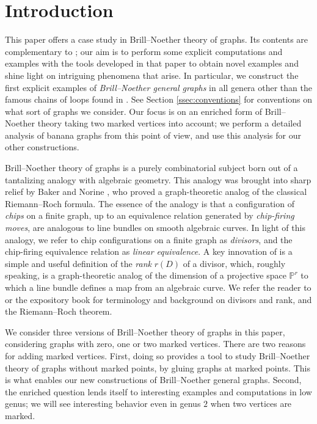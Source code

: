 \documentclass[11pt]{article}
\theoremstyle{definition}
\numberwithin{equation}{section}
\begin{document}
\section{Introduction}
This paper offers a case study in Brill--Noether theory of graphs. Its contents are complementary to \cite{Pfl22}; our aim is to perform some explicit computations and examples with the tools developed in that paper to obtain novel examples and shine light on intriguing phenomena that arise. In particular, we construct the first explicit examples of \emph{Brill--Noether general graphs} in all genera other than the famous chains of loops found in \cite{CDPR12}. 
See Section \ref{ssec:conventions} for conventions on what sort of graphs we consider.
Our focus is on an enriched form of Brill--Noether theory taking two marked vertices into account; we perform a detailed analysis of banana graphs from this point of view, and use this analysis for our other constructions.

Brill--Noether theory of graphs is a purely combinatorial subject born out of a tantalizing analogy with algebraic geometry. This analogy was brought into sharp relief by Baker and Norine \cite{BakNor07}, who proved a graph-theoretic analog of the classical Riemann--Roch formula. The essence of the analogy is that a configuration of \emph{chips} on a finite graph, up to an equivalence relation generated by \emph{chip-firing moves}, are analogous to line bundles on smooth algebraic curves. In light of this analogy, we refer to chip configurations on a finite graph as \emph{divisors}, and the chip-firing equivalence relation as \emph{linear equivalence}. A key innovation of \cite{BakNor07} is a simple and useful definition of the \emph{rank} $r(D)$ of a divisor, which, roughly speaking, is a graph-theoretic analog of the dimension of a projective space $\mathbb{P}^r$ to which a line bundle defines a map from an algebraic curve. We refer the reader to \cite{BakNor07} or the expository book \cite{corry2018divisors} for terminology and background on divisors and rank, and the Riemann--Roch theorem.

We consider three versions of Brill--Noether theory of graphs in this paper, considering graphs with zero, one or two marked vertices. There are two reasons for adding marked vertices. First, doing so provides a tool to study Brill--Noether theory of graphs without marked points, by gluing graphs at marked points. This is what enables our new constructions of Brill--Noether general graphs. Second, the enriched question lends itself to interesting examples and computations in low genus; we will see interesting behavior even in genus $2$ when two vertices are marked.
\end{document}
